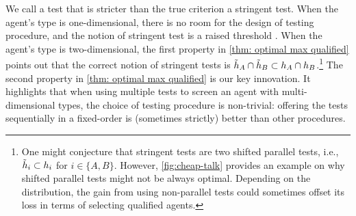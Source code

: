 We call a test that is stricter than the true criterion a stringent test.
    When the agent's type is one-dimensional, there is no room for the design of testing procedure, and the notion of stringent test is a raised threshold \citep{perez2022test}.  When the agent's type is two-dimensional, the first property in \cref{thm: optimal max qualified} points out that the correct notion of stringent tests is $\tilde{h}_A \cap \tilde {h}_B \subset h_A \cap h_B$.\footnote{One might conjecture that stringent tests are two shifted parallel tests, i.e.,  $\tilde{h}_i  \subset h_i$ for $i\in \{A,B\}$. However, \cref{fig:cheap-talk} provides an example on why shifted parallel tests might not be always optimal. Depending on the distribution, the gain from using non-parallel tests could sometimes offset its loss in terms of selecting qualified agents.}
    The second property in \cref{thm: optimal max qualified} is our key innovation. It highlights that when using multiple tests to screen an agent with multi-dimensional  types, the choice of testing procedure is non-trivial: offering the tests sequentially in a fixed-order is (sometimes strictly) better than other procedures.

